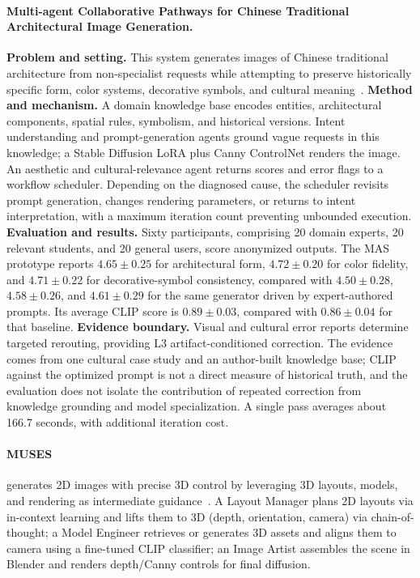 \paragraph{Multi-agent Collaborative Pathways for Chinese Traditional Architectural Image Generation.}
\textbf{Problem and setting.} This system generates images of Chinese traditional architecture from non-specialist requests while attempting to preserve historically specific form, color systems, decorative symbols, and cultural meaning~\cite{avgdoi101038s41598025181307}. \textbf{Method and mechanism.} A domain knowledge base encodes entities, architectural components, spatial rules, symbolism, and historical versions. Intent understanding and prompt-generation agents ground vague requests in this knowledge; a Stable Diffusion LoRA plus Canny ControlNet renders the image. An aesthetic and cultural-relevance agent returns scores and error flags to a workflow scheduler. Depending on the diagnosed cause, the scheduler revisits prompt generation, changes rendering parameters, or returns to intent interpretation, with a maximum iteration count preventing unbounded execution. \textbf{Evaluation and results.} Sixty participants, comprising 20 domain experts, 20 relevant students, and 20 general users, score anonymized outputs. The MAS prototype reports $4.65\pm0.25$ for architectural form, $4.72\pm0.20$ for color fidelity, and $4.71\pm0.22$ for decorative-symbol consistency, compared with $4.50\pm0.28$, $4.58\pm0.26$, and $4.61\pm0.29$ for the same generator driven by expert-authored prompts. Its average CLIP score is $0.89\pm0.03$, compared with $0.86\pm0.04$ for that baseline. \textbf{Evidence boundary.} Visual and cultural error reports determine targeted rerouting, providing L3 artifact-conditioned correction. The evidence comes from one cultural case study and an author-built knowledge base; CLIP against the optimized prompt is not a direct measure of historical truth, and the evaluation does not isolate the contribution of repeated correction from knowledge grounding and model specialization. A single pass averages about 166.7 seconds, with additional iteration cost.

\paragraph{MUSES}
 generates 2D images with precise 3D control by leveraging 3D layouts, models, and rendering as intermediate guidance~\cite{ding2025muses}. A Layout Manager plans 2D layouts via in-context learning and lifts them to 3D (depth, orientation, camera) via chain-of-thought; a Model Engineer retrieves or generates 3D assets and aligns them to camera using a fine-tuned CLIP classifier; an Image Artist assembles the scene in Blender and renders depth/Canny controls for final diffusion. 


